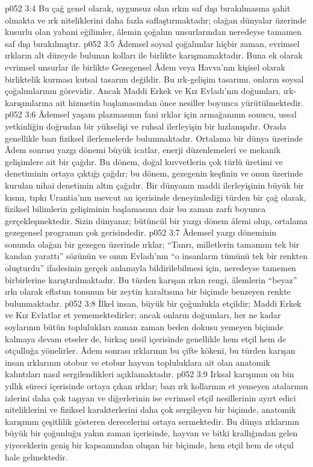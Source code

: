 \vs p052 3:4 Bu çağ genel olarak, uygunsuz olan ırkın saf dışı bırakılmasına şahit olmakta ve ırk niteliklerini daha fazla saflaştırmaktadır; olağan dünyalar üzerinde kusurlu olan yabani eğilimler, âlemin çoğalım unsurlarından neredeyse tamamen saf dışı bırakılmıştır.
\vs p052 3:5 Âdemsel soysal çoğalımlar hiçbir zaman, evrimsel ırkların alt düzeyde bulunan kolları ile birlikte karışmamaktadır. Buna ek olarak evrimsel unsurlar ile birlikte Gezegensel Âdem veya Havva’nın kişisel olarak birliktelik kurması kutsal tasarım değildir. Bu ırk\hyp{}gelişim tasarımı, onların soysal çoğalımlarının görevidir. Ancak Maddi Erkek ve Kız Evladı’nın doğumları, ırk\hyp{}karışımlarına ait hizmetin başlamasından önce nesiller boyunca yürütülmektedir.
\vs p052 3:6 Âdemsel yaşam plazmasının fani ırklar için armağanının sonucu, ussal yetkinliğin doğrudan bir yükselişi ve ruhsal ilerleyişin bir hızlanışıdır. Orada genellikle bazı fiziksel ilerlemelerde bulunmaktadır. Ortalama bir dünya üzerinde Âdem sonrası yazgı dönemi büyük icatlar, enerji düzenlemeleri ve mekanik gelişimlere ait bir çağdır. Bu dönem, doğal kuvvetlerin çok türlü üretimi ve denetiminin ortaya çıktığı çağdır; bu dönem, gezegenin keşfinin ve onun üzerinde kurulan nihai denetimin altın çağıdır. Bir dünyanın maddi ilerleyişinin büyük bir kısmı, tıpkı Urantia’nın mevcut an içerisinde deneyimlediği türden bir çağ olarak, fiziksel bilimlerin gelişiminin başlamasına dair bu zaman zarfı boyunca gerçekleşmektedir. Sizin dünyanız; bütüncül bir yazgı dönem âlemi olup, ortalama gezegensel programın çok gerisindedir.
\vs p052 3:7 Âdemsel yazgı döneminin sonunda olağan bir gezegen üzerinde ırklar; “Tanrı, milletlerin tamamını tek bir kandan yarattı” sözünün ve onun Evladı’nın “o insanların tümünü tek bir renkten oluşturdu” ifadesinin gerçek anlamıyla bildirilebilmesi için, neredeyse tamemen birbirlerine karıştırılmaktadır. Bu türden karışan ırkın rengi, âlemlerin “beyaz” ırkı olarak eflatun tonunun bir zeytin karaltısına bir biçimde benzeyen renkte bulunmaktadır.
\vs p052 3:8 İlkel insan, büyük bir çoğunlukla etçildir; Maddi Erkek ve Kız Evlatlar et yememektedirler; ancak onların doğumları, her ne kadar soylarının bütün toplulukları zaman zaman beden dokusu yemeyen biçimde kalmaya devam etseler de, birkaç nesil içerisinde genellikle hem etçil hem de otçulluğa yönelirler. Âdem sonrası ırklarının bu çifte kökeni, bu türden karışan insan ırklarının otobur ve etobur hayvan topluluklara ait olan anatomik kalıntıları nasıl sergilendikleri açıklamaktadır.
\vs p052 3:9 Irksal karışımın on bin yıllık süreci içerisinde ortaya çıkan ırklar; bazı ırk kollarının et yemeyen atalarının izlerini daha çok taşıyan ve diğerlerinin ise evrimsel etçil nesillerinin ayırt edici niteliklerini ve fiziksel karakterlerini daha çok sergileyen bir biçimde, anatomik karışımın çeşitlilik gösteren derecelerini ortaya sermektedir. Bu dünya ırklarının büyük bir çoğunluğu yakın zaman içerisinde, hayvan ve bitki krallığından gelen yiyeceklerin geniş bir kapsamından oluşan bir biçimde, hem etçil hem de otçul hale gelmektedir.

